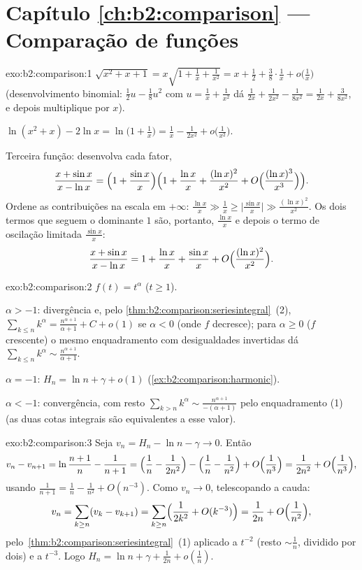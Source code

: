 \section*{Capítulo \ref{ch:b2:comparison} --- Comparação de funções}

\begin{solution}{exo:b2:comparison:1}
$\sqrt{x^2 + x + 1} = x\sqrt{1 + \tfrac1x + \tfrac{1}{x^2}} = x +
\frac12 + \frac38\cdot\frac1x + o\bigl(\frac1x\bigr)$ (desenvolvimento
binomial: $\frac12 u - \frac18 u^2$ com $u = \frac1x +
\frac{1}{x^2}$ dá $\frac{1}{2x} + \frac{1}{2x^2} -
\frac{1}{8x^2} = \frac{1}{2x} + \frac{3}{8x^2}$, e depois multiplique por
$x$).

$\ln(x^2 + x) - 2\ln x = \ln\bigl(1 + \tfrac1x\bigr) = \frac1x -
\frac{1}{2x^2} + o\bigl(\frac{1}{x^2}\bigr)$.

Terceira função: desenvolva cada fator,
\[
\frac{x + \sin x}{x - \ln x}
= \Bigl(1 + \frac{\sin x}{x}\Bigr)
\Bigl(1 + \frac{\ln x}{x} + \frac{(\ln x)^2}{x^2} +
O\Bigl(\frac{(\ln x)^3}{x^3}\Bigr)\Bigr).
\]
Ordene as contribuições na escala em $+\infty$: $\frac{\ln x}{x}
\gg \frac{1}{x} \geq \bigl|\frac{\sin x}{x}\bigr| \gg \frac{(\ln
x)^2}{x^2}$. Os dois termos que seguem o dominante $1$ são, portanto,
$\frac{\ln x}{x}$ e depois o termo de oscilação limitada $\frac{\sin
x}{x}$:
\[
\frac{x + \sin x}{x - \ln x}
= 1 + \frac{\ln x}{x} + \frac{\sin x}{x}
+ O\Bigl(\frac{(\ln x)^2}{x^2}\Bigr).
\]
\end{solution}

\begin{solution}{exo:b2:comparison:2}
$f(t) = t^\alpha$ ($t \geq 1$).

$\alpha > -1$: divergência e, pelo
\cref{thm:b2:comparison:seriesintegral}~(2), $\sum_{k\leq n}
k^\alpha = \frac{n^{\alpha+1}}{\alpha+1} + C + o(1)$ se $\alpha <
0$ (onde $f$ decresce); para $\alpha \geq 0$ ($f$ crescente) o
mesmo enquadramento com desigualdades invertidas dá $\sum_{k \leq n}
k^\alpha \sim \frac{n^{\alpha + 1}}{\alpha + 1}$.

$\alpha = -1$: $H_n = \ln n + \gamma + o(1)$
(\cref{ex:b2:comparison:harmonic}).

$\alpha < -1$: convergência, com resto $\sum_{k > n} k^\alpha
\sim \frac{n^{\alpha+1}}{-(\alpha+1)}$ pelo enquadramento (1) (as duas
cotas integrais são equivalentes a esse valor).
\end{solution}

\begin{solution}{exo:b2:comparison:3}
Seja $v_n = H_n - \ln n - \gamma \to 0$. Então
\[
v_n - v_{n+1} = \ln\frac{n+1}{n} - \frac{1}{n+1}
= \Bigl(\frac1n - \frac{1}{2n^2}\Bigr) - \Bigl(\frac1n -
\frac{1}{n^2}\Bigr) + O\Bigl(\frac{1}{n^3}\Bigr)
= \frac{1}{2n^2} + O\Bigl(\frac{1}{n^3}\Bigr),
\]
usando $\frac{1}{n+1} = \frac1n - \frac{1}{n^2} + O(n^{-3})$. Como
$v_n \to 0$, telescopando a cauda:
\[
v_n = \sum_{k \geq n} (v_k - v_{k+1})
= \sum_{k\geq n} \Bigl(\frac{1}{2k^2} + O(k^{-3})\Bigr)
= \frac{1}{2n} + O\Bigl(\frac{1}{n^2}\Bigr),
\]
pelo~\cref{thm:b2:comparison:seriesintegral}~(1) aplicado a $t^{-2}$
(resto $\sim \frac1n$, dividido por dois) e a $t^{-3}$. Logo $H_n =
\ln n + \gamma + \frac{1}{2n} + o(\frac1n)$.
\end{solution}

